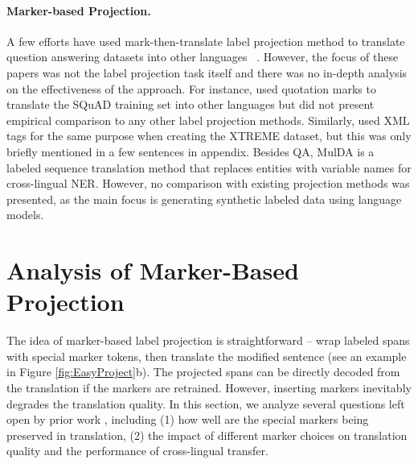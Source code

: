 \documentclass[11pt,dvipsnames]{article}
\begin{document}
\paragraph{Marker-based Projection.} A few efforts have used mark-then-translate label projection method to translate question answering datasets into other languages ~\citep{lee-etal-2018-semi,lewis2020mlqa, hu2020xtreme,bornea2020qa}. However, the focus of these papers was not the label projection task itself and there was no in-depth analysis on the effectiveness of the approach. For instance,  used quotation marks to translate the SQuAD training set into other languages but did not present empirical comparison to any other label projection methods. Similarly,  used XML tags for the same purpose when creating the XTREME dataset, but this was only briefly mentioned in a few sentences in appendix. Besides QA, MulDA \citep{liu-2021-mulda,zhou2022conner} is a labeled sequence translation method that replaces entities with variable names for cross-lingual NER. However, no comparison with existing  projection methods was presented, as the main focus is generating synthetic labeled data  using language models.






















\section{Analysis of Marker-Based Projection}
\label{EasyProject}
The idea of marker-based label projection is straightforward -- wrap labeled spans with special marker tokens, then translate the modified sentence (see an example in Figure \ref{fig:EasyProject}b). The projected spans can be directly decoded from the translation if the markers are retrained. However, inserting markers inevitably degrades the  translation quality.  In this section, we analyze several questions left open by prior work \cite{lewis2020mlqa, hu2020xtreme}, including  (1) how well are the special markers being  preserved in translation, (2) the impact of different marker choices on  translation quality and the performance of cross-lingual transfer.
\end{document}
